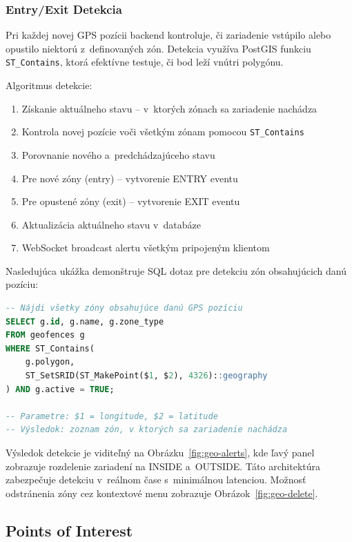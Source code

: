 \subsubsection{Entry/Exit Detekcia}

Pri každej novej GPS pozícii backend kontroluje, či zariadenie vstúpilo alebo opustilo niektorú z~definovaných zón. Detekcia využíva PostGIS funkciu \texttt{ST\_Contains}, ktorá efektívne testuje, či bod leží vnútri polygónu.

Algoritmus detekcie:

\begin{enumerate}
    \item Získanie aktuálneho stavu -- v~ktorých zónach sa zariadenie nachádza
    \item Kontrola novej pozície voči všetkým zónam pomocou \texttt{ST\_Contains}
    \item Porovnanie nového a~predchádzajúceho stavu
    \item Pre nové zóny (entry) -- vytvorenie ENTRY eventu
    \item Pre opustené zóny (exit) -- vytvorenie EXIT eventu
    \item Aktualizácia aktuálneho stavu v~databáze
    \item WebSocket broadcast alertu všetkým pripojeným klientom
\end{enumerate}

Nasledujúca ukážka demonštruje SQL dotaz pre detekciu zón obsahujúcich danú pozíciu:

\begin{lstlisting}[language=SQL, label=src:geofence-detect, caption={PostGIS detekcia zariadenia v~geofence zónach}]
-- Nájdi všetky zóny obsahujúce danú GPS pozíciu
SELECT g.id, g.name, g.zone_type
FROM geofences g
WHERE ST_Contains(
    g.polygon,
    ST_SetSRID(ST_MakePoint($1, $2), 4326)::geography
) AND g.active = TRUE;

-- Parametre: $1 = longitude, $2 = latitude
-- Výsledok: zoznam zón, v ktorých sa zariadenie nachádza
\end{lstlisting}

Výsledok detekcie je viditeľný na Obrázku~\ref{fig:geo-alerts}, kde ľavý panel zobrazuje rozdelenie zariadení na INSIDE a~OUTSIDE. Táto architektúra zabezpečuje detekciu v~reálnom čase s~minimálnou latenciou. Možnosť odstránenia zóny cez kontextové menu zobrazuje Obrázok~\ref{fig:geo-delete}.

\subsection{Points of Interest}
\label{sec:POI}

